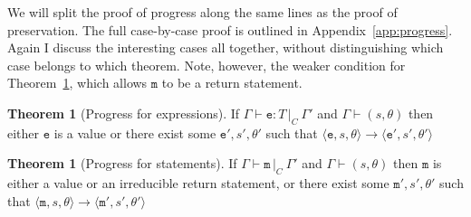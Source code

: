 \documentclass[12pt,a4paper,twoside,openright]{report}
\theoremstyle{definition}
\theoremstyle{dotless}
\newtheorem{theorem}[definition]{Theorem}
\newcommand{\typable}[2][ ]{\Gamma{}\vdash\mathtt{#2}\, |_C#1\:\Gamma#1'}
\newcommand{\typed}[2]{\Gamma{}\vdash\mathtt{#1}: #2\,|_C\:\Gamma'}
\newcommand{\transition}[6]{\langle{}\mathtt{#1},#2,#3\rangle{}\rightarrow{}\langle{}\mathtt{#4},#5,#6\rangle}
\begin{document}
We will split the proof of progress along the same lines as the proof of
preservation. The full case-by-case proof is outlined in Appendix~\ref{app:progress}.
Again I discuss the interesting cases all together, without distinguishing which
case belongs to which theorem. Note, however, the weaker condition for Theorem~\ref{mProgress},
which allows $\mathtt{m}$ to be a return statement.

\begin{theorem}[Progress for expressions]\label{expProgress} If
  $\typed{e}{T}$ and $\Gamma \vdash (s, \theta)$ then either $\mathtt{e}$ is a value or
  there exist some $\mathtt{e}',s', \theta'$ such that
  $\transition{e}{s}{\theta}{e'}{s'}{\theta'}$ \end{theorem}
\begin{theorem}[Progress for statements]\label{mProgress}
  If $\typable{\mathtt{m}}$ and $\Gamma \vdash (s, \theta)$ then $\mathtt{m}$ is either a
  value or an irreducible return statement, or there exist some $\mathtt{m}',s', \theta'$ such that
  $\transition{m}{s}{\theta}{m'}{s'}{\theta'}$ 
\end{theorem}
\end{document}
